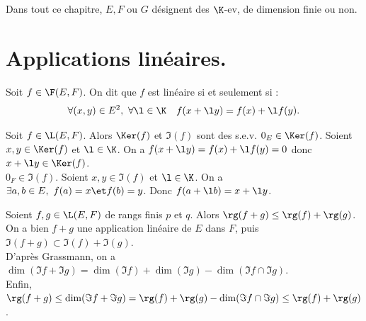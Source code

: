 \documentclass[11pt]{article}
\begin{document}


\thispagestyle{fancy}

Dans tout ce chapitre, $E,F$ ou $G$ désignent des $\K$-ev, de dimension finie ou non.

\vspace*{-0.4cm}

\section{Applications linéaires.}

\begin{defi}{}{}
    Soit $f\in\F(E,F)$. On dit que $f$ est linéaire si et seulement si :
    \begin{equation*}
        \forall (x,y) \in E^2, ~ \forall \l \in \K \quad f(x+\l y)=f(x) + \l f(y).
    \end{equation*}
\end{defi}

\begin{prop}{}{}
    Soit $f\in\L(E,F)$. Alors $\Ker(f)$ et $\Im(f)$ sont des s.e.v.
    \tcblower
    \boxed{\Ker} $0_E\in\Ker(f)$. Soient $x,y\in \Ker(f)$ et $\l\in\K$. On a $f(x+\l y) = f(x)+\l f(y)=0$ donc $x+\l y \in \Ker(f)$.\\
    \boxed{\Im} $0_F\in\Im(f)$. Soient $x,y\in\Im(f)$ et $\l\in\K$. On a $\exists a,b\in E, ~ f(a)=x \et f(b)=y$. Donc $f(a+\l b)=x+\l y$.
\end{prop}

\begin{prop}{}{}
    Soient $f,g\in\L(E,F)$ de rangs finis $p$ et $q$. Alors $\rg(f+g)\leq\rg(f)+\rg(g)$.
    \tcblower
    On a bien $f+g$ une application linéaire de $E$ dans $F$, puis $\Im(f+g)\subset\Im(f)+\Im(g)$.\\
    D'après Grassmann, on a $\dim(\Im f + \Im g)=\dim(\Im f) + \dim(\Im g) - \dim(\Im f \cap \Im g)$.\\
    Enfin, $\rg(f+g)\leq\dim(\Im f + \Im g)=\rg(f) + \rg(g)  - \dim(\Im f \cap \Im g)\leq \rg(f) + \rg(g)$.
\end{prop}
\end{document}

